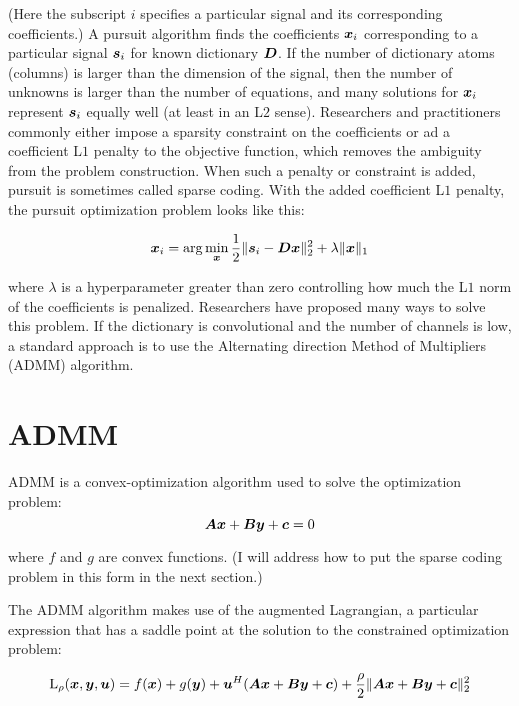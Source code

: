 (Here the subscript $i$ specifies a particular signal and its corresponding coefficients.) A pursuit algorithm finds the coefficients $\bm{x}_i$ corresponding to a particular signal $\bm{s}_i$ for known dictionary $\bm{D}$. If the number of dictionary atoms (columns) is larger than the dimension of the signal, then the number of unknowns is larger than the number of equations, and many solutions for $\bm{x}_i$ represent $\bm{s}_i$ equally well (at least in an L$2$ sense). Researchers and practitioners commonly either impose a sparsity constraint on the coefficients or ad a coefficient L$1$ penalty to the objective function, which removes the ambiguity from the problem construction. When such a penalty or constraint is added, pursuit is sometimes called sparse coding. With the added coefficient L$1$ penalty, the pursuit optimization problem looks like this:

\begin{equation}
\bm{x}_i = \arg\min_{\bm{x}} \frac{1}{2}\|\bm{s}_i - \bm{D}\bm{x}\|_2^2 + \lambda \|\bm{x}\|_1
\end{equation}

where $\lambda$ is a hyperparameter greater than zero controlling how much the L$1$ norm of the coefficients is penalized. Researchers have proposed many ways to solve this problem. If the dictionary is convolutional and the number of channels is low, a standard approach is to use the Alternating direction Method of Multipliers (ADMM) algorithm.

\section{ADMM}
ADMM is a convex-optimization algorithm used to solve the optimization problem:
\begin{equation}
\bm{A}\bm{x} + \bm{B}\bm{y} + \bm{c} = 0 
\end{equation}

where $f$ and $g$ are convex functions. (I will address how to put the sparse coding problem in this form in the next section.)

The ADMM algorithm makes use of the augmented Lagrangian, a particular expression that has a saddle point at the solution to the constrained optimization problem:

\begin{equation}
\operatorname{L}_{\rho}(\bm{x},\bm{y},\bm{u}) = f(\bm{x}) + g(\bm{y}) + \bm{u}^H(\bm{A}\bm{x} + \bm{B}\bm{y} + \bm{c}) + \frac{\rho}{2}\|\bm{A}\bm{x} + \bm{B}\bm{y} + \bm{c}\|_2^2
\end{equation}

